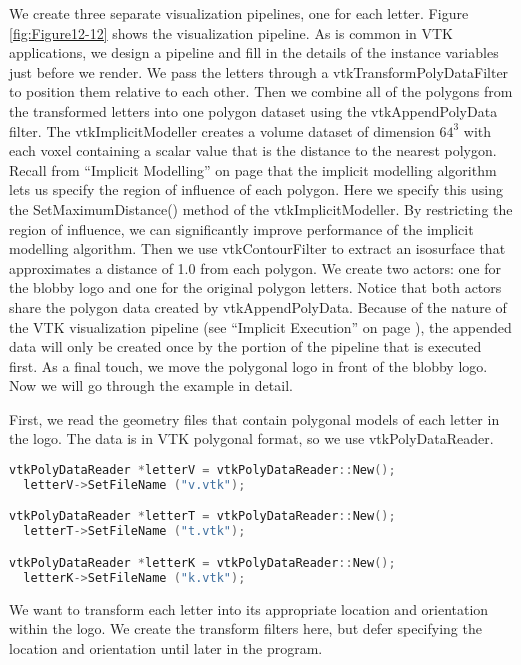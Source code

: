 We create three separate visualization pipelines, one for each letter. Figure \ref{fig:Figure12-12} shows the visualization pipeline.
As is common in VTK applications, we design a pipeline and fill in the details of the instance variables just before we render.
We pass the letters through a vtkTransformPolyDataFilter to position them relative to each other.
Then we combine all of the polygons from the transformed letters into one polygon dataset using the vtkAppendPolyData filter.
The vtkImplicitModeller creates a volume dataset of dimension $64^3$ with each voxel containing a scalar value that is the distance to the nearest polygon.
Recall from ``Implicit Modelling'' on page \pageref{subsec:implicit_modelling} that the implicit modelling algorithm lets us specify the region of influence of each polygon. Here we specify this using the SetMaximumDistance() method of the vtkImplicitModeller.
By restricting the region of influence, we can significantly improve performance of the implicit modelling algorithm.
Then we use vtkContourFilter to extract an isosurface that approximates a distance of 1.0 from each polygon.
We create two actors: one for the blobby logo and one for the original polygon letters.
Notice that both actors share the polygon data created by vtkAppendPolyData. Because of the nature of the VTK visualization pipeline (see ``Implicit Execution'' on page \pageref{subsec:implicit_execution} ), the appended data will only be created once by the portion of the pipeline that is executed first.
As a final touch, we move the polygonal logo in front of the blobby logo. Now we will go through the example in detail.

First, we read the geometry files that contain polygonal models of each letter in the logo. The data is in VTK polygonal format, so we use vtkPolyDataReader.

\begin{lstlisting}[language=C++, caption={Reading the polygonal models of each letter.}]
vtkPolyDataReader *letterV = vtkPolyDataReader::New();
  letterV->SetFileName ("v.vtk");

vtkPolyDataReader *letterT = vtkPolyDataReader::New();
  letterT->SetFileName ("t.vtk");

vtkPolyDataReader *letterK = vtkPolyDataReader::New();
  letterK->SetFileName ("k.vtk");
\end{lstlisting}

We want to transform each letter into its appropriate location and orientation within the logo. We create the transform filters here, but defer specifying the location and orientation until later in the program.

